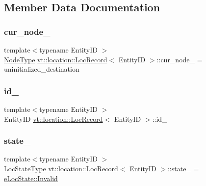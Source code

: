 \subsection{Member Data Documentation}
\mbox{\label{structvt_1_1location_1_1_loc_record_aff7390974f2a2c874bde346db67fac13}} 
\subsubsection{\texorpdfstring{cur\+\_\+node\+\_\+}{cur\_node\_}}
{\footnotesize\ttfamily template$<$typename Entity\+ID $>$ \\
\hyperlink{namespacevt_a866da9d0efc19c0a1ce79e9e492f47e2}{Node\+Type} \hyperlink{structvt_1_1location_1_1_loc_record}{vt\+::location\+::\+Loc\+Record}$<$ Entity\+ID $>$\+::cur\+\_\+node\+\_\+ = uninitialized\+\_\+destination\hspace{0.3cm}{\ttfamily [private]}}

\mbox{\label{structvt_1_1location_1_1_loc_record_a165c38a690d7fadd583fa05e9e2b4a25}} 
\subsubsection{\texorpdfstring{id\+\_\+}{id\_}}
{\footnotesize\ttfamily template$<$typename Entity\+ID $>$ \\
Entity\+ID \hyperlink{structvt_1_1location_1_1_loc_record}{vt\+::location\+::\+Loc\+Record}$<$ Entity\+ID $>$\+::id\+\_\+\hspace{0.3cm}{\ttfamily [private]}}

\mbox{\label{structvt_1_1location_1_1_loc_record_a61f9aee0764759d61b9e3fddebe602cd}} 
\subsubsection{\texorpdfstring{state\+\_\+}{state\_}}
{\footnotesize\ttfamily template$<$typename Entity\+ID $>$ \\
\hyperlink{namespacevt_1_1location_a7a5c74aad68cf57281515029d8521547}{Loc\+State\+Type} \hyperlink{structvt_1_1location_1_1_loc_record}{vt\+::location\+::\+Loc\+Record}$<$ Entity\+ID $>$\+::state\+\_\+ = \hyperlink{namespacevt_1_1location_a7a5c74aad68cf57281515029d8521547a4bbb8f967da6d1a610596d7257179c2b}{e\+Loc\+State\+::\+Invalid}\hspace{0.3cm}{\ttfamily [private]}}




